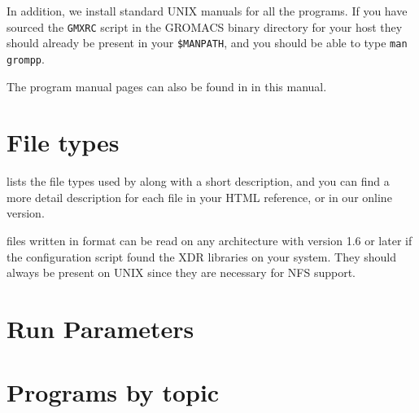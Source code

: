In addition, we install standard UNIX manuals for all the programs. If
you have sourced the {\tt GMXRC} script in the GROMACS binary directory for
your host they should already be present in your {\tt \$MANPATH}, and you
should be able to type {\eg} {\tt man grompp}.

The program manual pages can also be found in
 in this manual.

\section{File types}
\label{sec:fileformats}
 lists the file types used by {\gromacs} along with
a short description, and you can find a more detail description for
each file in your HTML reference, or in our online version.

{\gromacs} files written in  format can be read on any
architecture with {\gromacs} version 1.6 or later if the configuration
script found the XDR libraries on your system. They should always be
present on UNIX since they are necessary for NFS support.



\section{Run Parameters}


\section{Programs by topic}


